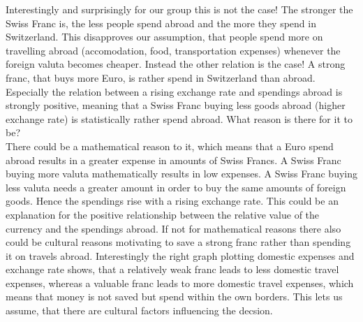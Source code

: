 \documentclass[12pt,a4paper,bibliography=totocnumbered,listof=totocnumbered]{scrartcl}
\begin{document}
Interestingly and surprisingly for our group this is not the case! The stronger the Swiss Franc is, the less people spend abroad and the more they spend in Switzerland. This disapproves our assumption, that people spend more on travelling abroad (accomodation, food, transportation expenses) whenever the foreign valuta becomes cheaper. Instead the other relation is the case! A strong franc, that buys more Euro, is rather spend in Switzerland than abroad. Especially the relation between a rising exchange rate and spendings abroad is strongly positive, meaning that a Swiss Franc buying less goods abroad (higher exchange rate) is statistically rather spend abroad. What reason is there for it to be?\\ There could be a mathematical reason to it, which means that a Euro spend abroad results in a greater expense in amounts of Swiss Francs. A Swiss Franc buying more valuta mathematically results in low expenses. A Swiss Franc buying less valuta needs a greater amount in order to buy the same amounts of foreign goods. Hence the spendings rise with a rising exchange rate. This could be an explanation for the positive relationship between the relative value of the currency and the spendings abroad. If not for mathematical reasons there also could be cultural reasons motivating to save a strong franc rather than spending it on travels abroad. Interestingly the right graph plotting domestic expenses and exchange rate shows, that a relatively weak franc leads to less domestic travel expenses, whereas a valuable franc leads to more domestic travel expenses, which means that money is not saved but spend within the own borders. This lets us assume, that there are cultural factors influencing the decsion.
\\
\newpage
\end{document}
